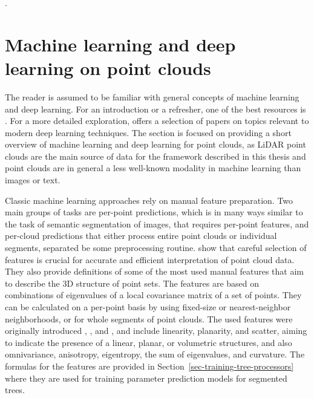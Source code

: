 \cite{nilssonEstimationTreeHeights1996, naessetDeterminationMeanTree1997, naessetEstimatingTimberVolume1997, carson2004lidar}.

\section{Machine learning and deep learning on point clouds}\label{sec-ml-dl}

The reader is assumed to be familiar with general concepts of machine learning and deep learning.
For an introduction or a refresher, one of the best resources is \cite{goodfellowDeepLearning2016}.
For a more detailed exploration, \cite{wangRecentAdvancesDeep2020} offers a selection of papers on topics relevant to modern deep learning techniques.
The section is focused on providing a short overview of machine learning and deep learning for point clouds, as LiDAR point clouds are the main source of data for the framework described in this thesis and point clouds are in general a less well-known modality in machine learning than images or text.

Classic machine learning approaches rely on manual feature preparation.
Two main groups of tasks are per-point predictions, which is in many ways similar to the task of semantic segmentation of images, that requires per-point features, and per-cloud predictions that either process entire point clouds or individual segments, separated be some preprocessing routine.
\cite{weinmannFeatureRelevanceAssessment2013} show that careful selection of features is crucial for accurate and efficient interpretation of point cloud data.
They also provide definitions of some of the most used manual features that aim to describe the 3D structure of point sets.
The features are based on combinations of eigenvalues of a local covariance matrix of a set of points.
They can be calculated on a per-point basis by using fixed-size or nearest-neighbor neighborhoods, or for whole segments of point clouds.
The used features were originally introduced \cite{westContextdrivenAutomatedTarget2004}, \cite{paulyEfficientSimplificationPointsampled2002}, and \cite{malletRelevanceAssessmentFullwaveform2011}, and include linearity, planarity, and scatter, aiming to indicate the presence of a linear, planar, or volumetric structures, and also omnivariance, anisotropy, eigentropy, the sum of eigenvalues, and curvature.
The formulas for the features are provided in Section~\ref{sec-training-tree-processors} where they are used for training parameter prediction models for segmented trees.

